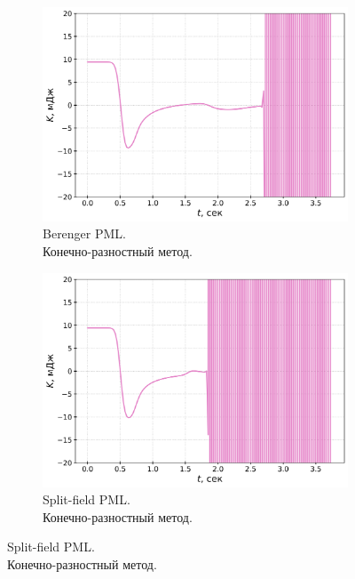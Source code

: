 \begin{figure}[htb]
\centering
\captionsetup[subfigure]{justification=centering}
    \begin{subfigure}{0.475\textwidth}
        \centering
        \includegraphics[width=1.0\textwidth]{images/pml/osc_fd_Berenger.png}
        \caption{Berenger PML.\\Конечно-разностный метод.}
        \label{fig:osc_fd_berenger}
    \end{subfigure}
\hfill
    \begin{subfigure}{0.475\textwidth}
        \centering
        \includegraphics[width=1.0\textwidth]{images/pml/osc_fd_split-field.png}
        \caption{Split-field PML.\\Конечно-разностный метод.}
        \label{fig:osc_fd_split}
    \end{subfigure}

\end{figure}
